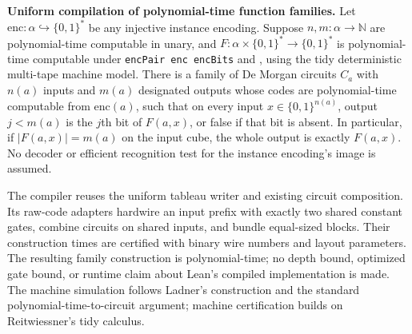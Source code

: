 \begin{result}
\textbf{Uniform compilation of polynomial-time function families.}
Let $\mathrm{enc}:\alpha\hookrightarrow\{0,1\}^*$ be any injective instance encoding.
Suppose $n,m:\alpha\to\mathbb N$ are polynomial-time computable in unary, and
$F:\alpha\times\{0,1\}^*\to\{0,1\}^*$ is polynomial-time computable under
\texttt{encPair enc encBits} and , using the tidy deterministic
multi-tape machine model. There is a family of De Morgan circuits $C_a$ with
$n(a)$ inputs and $m(a)$ designated outputs whose codes are polynomial-time
computable from $\mathrm{enc}(a)$, such that on every input $x\in\{0,1\}^{n(a)}$,
output $j<m(a)$ is the $j$th bit of $F(a,x)$, or false if that bit is absent.
In particular, if $|F(a,x)|=m(a)$ on the input cube, the whole output is exactly
$F(a,x)$. No decoder or efficient recognition test for the instance encoding's
image is assumed.

The compiler reuses the uniform tableau writer and existing circuit composition.
Its raw-code adapters hardwire an input prefix with exactly two shared constant
gates, combine circuits on shared inputs, and bundle equal-sized blocks.
Their construction times are certified with binary wire numbers and layout
parameters. The resulting family construction is polynomial-time; no depth bound,
optimized gate bound, or runtime claim about Lean's compiled implementation is made.
The machine simulation follows Ladner's construction and the standard
polynomial-time-to-circuit argument; machine certification builds on
Reitwiessner's tidy calculus.\citep{Ladner1975,AroraBarak09,Papadimitriou94}
\end{result}

